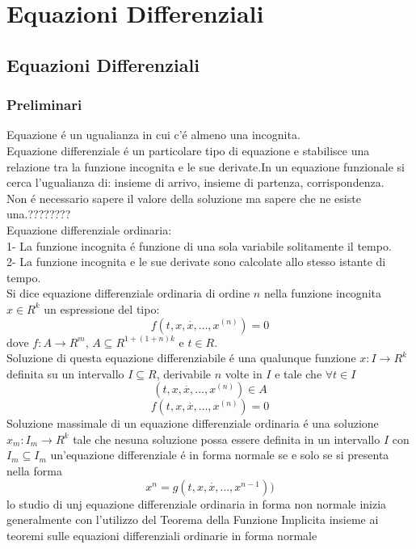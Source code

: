 \part{Equazioni Differenziali}
\chapter{Equazioni Differenziali}
\section{Preliminari}
Equazione \'e un ugualianza in cui c'\'e almeno una incognita.\\
Equazione differenziale \'e un particolare tipo di equazione e stabilisce una relazione tra la funzione incognita e le sue derivate.In un equazione funzionale si cerca l'ugualianza di: insieme di arrivo, insieme di partenza, corrispondenza.\\
Non \'e necessario sapere il valore della soluzione ma sapere che ne esiste una.????????\\
Equazione differenziale ordinaria:\\
1- La funzione incognita \'e funzione di una sola variabile solitamente il tempo.\\
2- La funzione incognita e le sue derivate sono calcolate allo stesso istante di tempo.\\
Si dice equazione differenziale ordinaria di ordine $n$ nella funzione incognita $x\in R^k$ un espressione del tipo:\\
$$f(t,x,\overset{\cdot}{x},\ldots,x^{(n)})=0$$
dove $f:A\to R^m$, $A\subseteq R^{1+(1+n)k}$ e $t\in R$.\\
Soluzione di questa equazione differenziabile \'e una qualunque funzione $x:I\to R^k$ definita su un intervallo $I\subseteq R$, derivabile $n$ volte in $I$ e tale che $\forall t\in I$\\
$$ (t,x,\overset{\cdot}{x},\ldots,x^{(n)}) \in A$$
$$ f(t,x,\overset{\cdot}{x},\ldots,x^{(n)})=0$$
Soluzione massimale  di un equazione differenziale ordinaria \'e una soluzione $x_m:I_m\to R^k$ tale che nesuna soluzione possa essere definita in un intervallo $I$ con $I_m\subseteq I_m$
un'equazione differenziale \'e in forma normale  se e solo se si presenta nella forma 
$$x^n = g(t,x,\overset{\cdot}{x},\ldots,x^{n-1}))$$
\observation
lo studio di unj equazione differenziale ordinaria in forma non normale inizia generalmente con l'utilizzo del Teorema della Funzione Implicita insieme ai teoremi sulle equazioni differenziali ordinarie in forma normale

